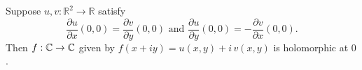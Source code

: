 \documentclass{homework}
\begin{document}
                                                                                                             \begin{problem}\label{cauchy-riemann-alone-not-sufficient}Suppose $u, v : \mathbb{R}^2 \to \mathbb{R}$ satisfy
                                                                                                               \[
                                                                                                                   \frac{\partial u}{\partial x}(0,0)=\frac{\partial v}{\partial y}(0,0)
                                                                                                                       \mbox{ and }
                                                                                                                           \frac{\partial u}{\partial y}(0,0)=-\frac{\partial v}{\partial x}(0,0).
                                                                                                                             \]
                                                                                                                               Then $f : \mathbb{C} \to \mathbb{C}$ given by $f(x+iy) = u(x,y) + i \, v(x,y)$ is holomorphic at $0$.
                                                                                                                               \end{problem}
\end{document}
